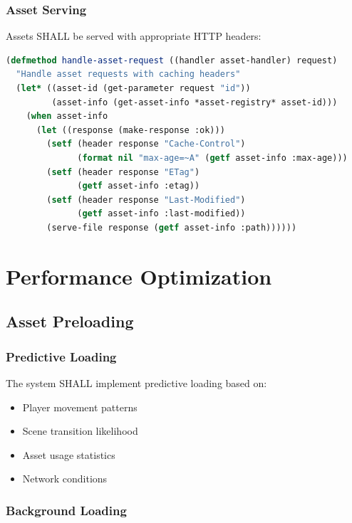 \documentclass[12pt,a4paper]{article}
\begin{document}
\subsubsection{Asset Serving}

Assets SHALL be served with appropriate HTTP headers:

\begin{lstlisting}[language=Lisp, caption=Asset Serving Handler]
(defmethod handle-asset-request ((handler asset-handler) request)
  "Handle asset requests with caching headers"
  (let* ((asset-id (get-parameter request "id"))
         (asset-info (get-asset-info *asset-registry* asset-id)))
    (when asset-info
      (let ((response (make-response :ok)))
        (setf (header response "Cache-Control")
              (format nil "max-age=~A" (getf asset-info :max-age)))
        (setf (header response "ETag")
              (getf asset-info :etag))
        (setf (header response "Last-Modified")
              (getf asset-info :last-modified))
        (serve-file response (getf asset-info :path))))))
\end{lstlisting}

\section{Performance Optimization}

\subsection{Asset Preloading}

\subsubsection{Predictive Loading}

The system SHALL implement predictive loading based on:

\begin{itemize}
\item Player movement patterns
\item Scene transition likelihood
\item Asset usage statistics
\item Network conditions
\end{itemize}

\subsubsection{Background Loading}
\end{document}
